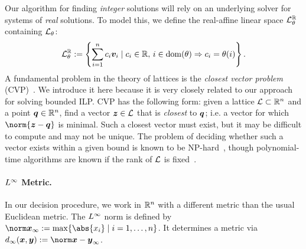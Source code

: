 Our algorithm for finding \emph{integer} solutions will rely on an
underlying solver for systems of \emph{real} solutions.  To model this,
we define the real-affine linear space $\mathcal{L}^{\mathbb{R}}_\theta$ containing
$\mathcal{L}_\theta$:
%
\begin{equation}
     \mathcal{L}^{\mathbb{R}}_\theta := \left\{ \sum_{i=1}^n c_i \boldsymbol{v}_i \mid c_i \in \mathbb{R}, \,
        i \in \mathrm{dom}(\theta) \Rightarrow c_i = \theta(i) \right\}.
\end{equation}
%
A fundamental problem in the theory of lattices is the \emph{closest vector
problem} (CVP)~\cite{Lenstra}. We introduce it here because it is very
closely related to our approach for solving bounded ILP. CVP has the following
form: given a lattice $\mathcal{L} \subset \mathbb{R}^n$ and a point $\boldsymbol{q} \in \mathbb{R}^n$, find
a vector $\boldsymbol{z} \in \mathcal{L}$ that is \emph{closest} to $\boldsymbol{q}$; i.e. a vector for
which $\norm{\v{z}-\v{q}}$ is minimal.
%
Such a closest vector must exist, but it may be difficult to compute and may
not be unique.
%
The problem of deciding whether such a vector exists within a given bound
is known to be NP-hard~\cite{Boas}, though polynomial-time algorithms are
known if the rank of $\mathcal{L}$ is fixed~\cite{Schnorr-hierarchy}.
%
\paragraph{$L^\infty$ Metric.} In our decision procedure, we work in $\mathbb{R}^n$
with a different metric than the usual Euclidean metric. The $L^\infty$ norm is
defined by $\norminf{\v{x}} := \max \{ \abs{x_i} \mid i=1,\ldots,n \}$. It
determines a metric via $d_\infty(\v{x}, \v{y}) := \norminf{\v{x}-\v{y}}$.


